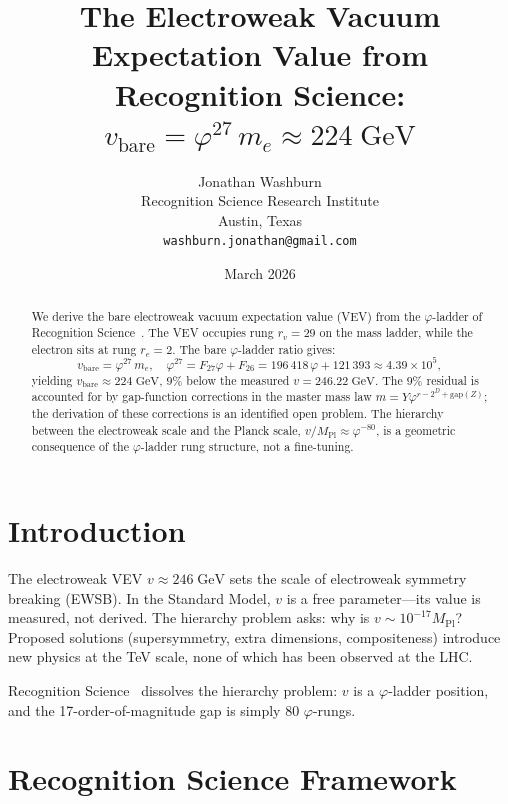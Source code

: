 \documentclass[12pt,a4paper]{article}
\title{The Electroweak Vacuum Expectation Value from
Recognition Science:\\
$v_{\mathrm{bare}} = \varphi^{27}\,m_e \approx 224\;\mathrm{GeV}$}
\author{Jonathan Washburn\\
Recognition Science Research Institute\\
Austin, Texas\\
\texttt{washburn.jonathan@gmail.com}}
\date{March 2026}
\theoremstyle{definition}
\theoremstyle{remark}
\begin{document}
\maketitle

\begin{abstract}
We derive the bare electroweak vacuum expectation value (VEV) from
the $\varphi$-ladder of Recognition Science~\cite{RS_Axioms}.  The
VEV occupies rung $r_v = 29$ on the mass ladder, while the electron
sits at rung $r_e = 2$.  The bare $\varphi$-ladder ratio gives:
\[
  v_{\mathrm{bare}} = \varphi^{27}\,m_e,\quad
  \varphi^{27} = F_{27}\varphi + F_{26}
  = 196\,418\,\varphi + 121\,393 \approx 4.39 \times 10^5,
\]
yielding $v_{\mathrm{bare}} \approx 224\;\mathrm{GeV}$, $9\%$ below
the measured $v = 246.22\;\mathrm{GeV}$.  The $9\%$ residual is
accounted for by gap-function corrections in the master mass law
$m = Y\varphi^{r - 2^D + \mathrm{gap}(Z)}$; the derivation of these
corrections is an identified open problem.  The hierarchy between the
electroweak scale and the Planck scale, $v/M_{\mathrm{Pl}} \approx
\varphi^{-80}$, is a geometric consequence of the $\varphi$-ladder
rung structure, not a fine-tuning.
\end{abstract}

\section{Introduction}
\label{sec:intro}

The electroweak VEV $v \approx 246\;\mathrm{GeV}$ sets the scale
of electroweak symmetry breaking (EWSB).  In the Standard Model,
$v$ is a free parameter---its value is measured, not derived.  The
hierarchy problem asks: why is $v \sim 10^{-17} M_{\mathrm{Pl}}$?
Proposed solutions (supersymmetry, extra dimensions, compositeness)
introduce new physics at the TeV scale, none of which has been
observed at the LHC.

Recognition Science~\cite{RS_Axioms} dissolves the hierarchy
problem: $v$ is a $\varphi$-ladder position, and the
17-order-of-magnitude gap is simply 80 $\varphi$-rungs.

\section{Recognition Science Framework}
\label{sec:framework}
\end{document}
